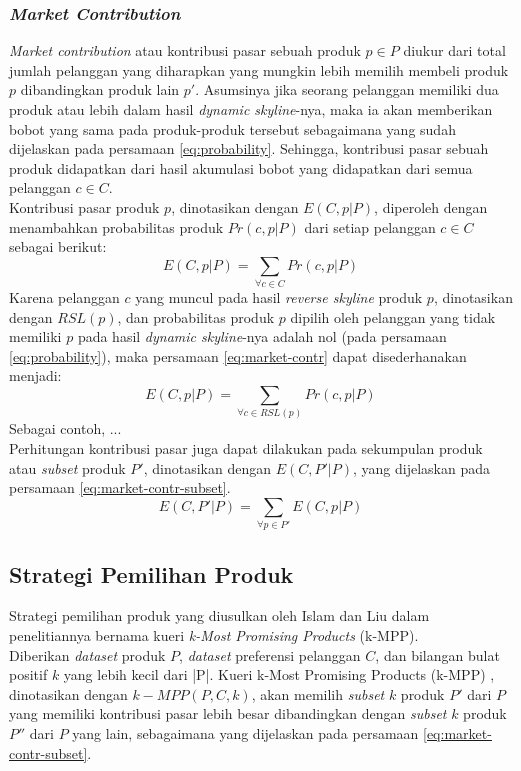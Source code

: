 \subsubsection{\textit{Market Contribution}}
\tab \textit{Market contribution} atau kontribusi pasar sebuah produk $p \in P$ diukur dari total jumlah pelanggan yang diharapkan yang mungkin lebih memilih membeli produk $p$ dibandingkan produk lain $p'$. Asumsinya jika seorang pelanggan memiliki dua produk atau lebih dalam hasil \textit{dynamic skyline}-nya, maka ia akan memberikan bobot yang sama pada produk-produk tersebut sebagaimana yang sudah dijelaskan pada persamaan \ref{eq:probability}. Sehingga, kontribusi pasar sebuah produk didapatkan dari hasil akumulasi bobot yang didapatkan dari semua pelanggan $c \in C$. \\
\tab Kontribusi pasar produk $p$, dinotasikan dengan $E(C, p|P)$, diperoleh dengan menambahkan probabilitas produk $Pr(c, p|P)$ dari setiap pelanggan $c \in C$ sebagai berikut:\\
\begin{equation}\label{eq:market-contr}
E(C, p|P) = \sum_{\forall c \in C} Pr(c, p|P)
\end{equation}
\tab Karena pelanggan $c$ yang muncul pada hasil \textit{reverse skyline} produk $p$, dinotasikan dengan $RSL(p)$, dan probabilitas produk $p$ dipilih oleh pelanggan yang tidak memiliki $p$ pada hasil \textit{dynamic skyline}-nya adalah nol (pada persamaan \ref{eq:probability}), maka persamaan \ref{eq:market-contr} dapat disederhanakan menjadi:
\begin{equation}\label{eq:market-contr-rsl}
E(C, p|P) = \sum_{\forall c \in RSL(p)} Pr(c, p|P)
\end{equation}
\tab Sebagai contoh, ...\\
\tab Perhitungan kontribusi pasar juga dapat dilakukan pada sekumpulan produk atau \textit{subset} produk $P'$, dinotasikan dengan $E(C, P'|P)$, yang dijelaskan pada persamaan \ref{eq:market-contr-subset}.
\begin{equation}\label{eq:market-contr-subset}
E(C, P'|P) = \sum_{\forall p \in P'} E(C, p|P)
\end{equation}

\subsection{Strategi Pemilihan Produk}
\tab Strategi pemilihan produk yang diusulkan oleh Islam dan Liu dalam penelitiannya \cite{kmpp} bernama kueri \textit{k-Most Promising Products} (k-MPP). \\
\tab Diberikan \textit{dataset} produk $P$, \textit{dataset} preferensi pelanggan $C$, dan bilangan bulat positif $k$ yang lebih kecil dari |P|. Kueri k-Most Promising Products (k-MPP) \cite{kmpp}, dinotasikan dengan $k-MPP(P, C, k)$, akan memilih \textit{subset} $k$ produk $P'$ dari $P$ yang memiliki kontribusi pasar lebih besar dibandingkan dengan \textit{subset} $k$ produk $P''$ dari $P$ yang lain, sebagaimana yang dijelaskan pada persamaan \ref{eq:market-contr-subset}.

